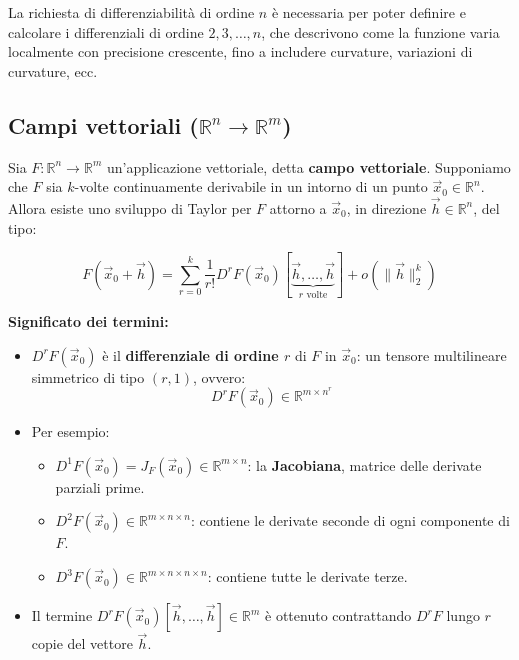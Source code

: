\documentclass[12pt,a4paper]{article}
\begin{document}
La richiesta di differenziabilità di ordine \( n \) è necessaria per poter definire e calcolare i differenziali di ordine \( 2, 3, \ldots, n \), che descrivono come la funzione varia localmente con precisione crescente, fino a includere curvature, variazioni di curvature, ecc.

\subsection*{Campi vettoriali (\( \mathbb{R}^n \to \mathbb{R}^m \))}

Sia \( F : \mathbb{R}^n \to \mathbb{R}^m \) un'applicazione vettoriale, detta \textbf{campo vettoriale}.  
Supponiamo che \( F \) sia \( k \)-volte continuamente derivabile in un intorno di un punto \( \vec{x}_0 \in \mathbb{R}^n \). Allora esiste uno sviluppo di Taylor per \( F \) attorno a \( \vec{x}_0 \), in direzione \( \vec{h} \in \mathbb{R}^n \), del tipo:

\[
F(\vec{x}_0 + \vec{h}) = \sum_{r=0}^{k} \frac{1}{r!} D^r F(\vec{x}_0)[\underbrace{\vec{h}, \dots, \vec{h}}_{r \text{ volte}}] + o(\|\vec{h}\|_2^k)
\]

\textbf{Significato dei termini:}
\begin{itemize}
  \item \( D^r F(\vec{x}_0) \) è il \textbf{differenziale di ordine \( r \)} di \( F \) in \( \vec{x}_0 \): un tensore multilineare simmetrico di tipo \( (r,1) \), ovvero:
  \[
  D^r F(\vec{x}_0) \in \mathbb{R}^{m \times n^r}
  \]
  \item Per esempio:
  \begin{itemize}
    \item \( D^1 F(\vec{x}_0) = J_F(\vec{x}_0) \in \mathbb{R}^{m \times n} \): la \textbf{Jacobiana}, matrice delle derivate parziali prime.
    \item \( D^2 F(\vec{x}_0) \in \mathbb{R}^{m \times n \times n} \): contiene le derivate seconde di ogni componente di \( F \).
    \item \( D^3 F(\vec{x}_0) \in \mathbb{R}^{m \times n \times n \times n} \): contiene tutte le derivate terze.
  \end{itemize}
  \item Il termine \( D^r F(\vec{x}_0)[\vec{h}, \dots, \vec{h}] \in \mathbb{R}^m \) è ottenuto contrattando \( D^r F \) lungo \( r \) copie del vettore \( \vec{h} \).
\end{itemize}
\end{document}
